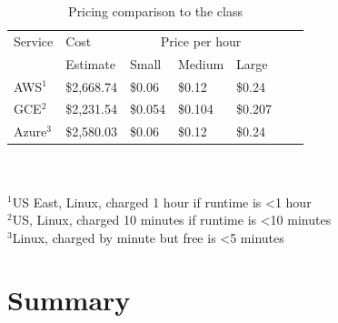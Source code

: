\documentclass{sig-alternate-05-2015}
\begin{document}

\begin{table}[h!]
\caption{Pricing comparison to the class}\label{T:tab2}
\begin{small}
\begin{tabular}{l|l|l|l|l|l|p{2cm}|}
Service & Cost & \multicolumn{3}{|c|}{Price per hour} \\
  & Estimate &  Small& Medium& Large \\
 \hline
AWS$^1$ & \$2,668.74  & \$0.06 & \$0.12 & \$0.24 \\
GCE$^2$ & \$2,231.54  & \$0.054 & \$0.104 & \$0.207 \\
Azure$^3$ & \$2,580.03  & \$0.06 & \$0.12 & \$0.24 \\ 
\end{tabular}
\\
\\
$^1$US East, Linux, charged 1 hour if runtime is <1 hour\\
$^2$US, Linux, charged 10 minutes if runtime is <10 minutes\\
$^3$Linux, charged by minute but free is <5 minutes\\
\end{small}
\end{table}


\section{Summary}


\end{document}
